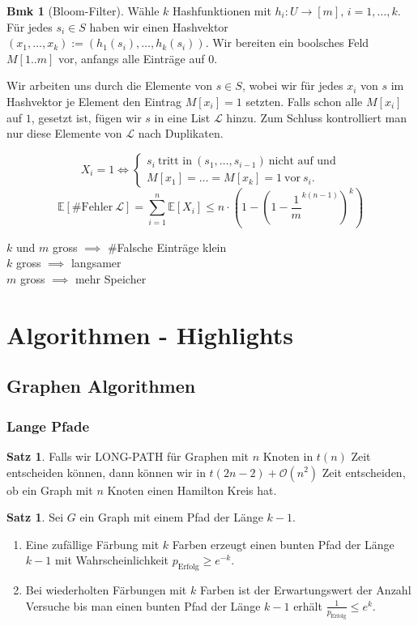 \documentclass[a4paper, 10pt]{article}
\theoremstyle{definition}
\newtheorem{theorem}[definition]{Satz}
\newtheorem*{note}{Bmk}
\theoremstyle{named}
\newcommand{\BO}{\mathcal{O}}
\newcommand{\E}{\mathbb{E}}
\begin{document}
\begin{note}[Bloom-Filter]
    Wähle $k$ Hashfunktionen mit $h_i: U \to [m], \, i=1,\ldots,k$. Für jedes $s_i \in S$ haben wir einen Hashvektor $(x_1, \ldots, x_k) := (h_1(s_i), \ldots, h_k(s_i))$. Wir bereiten ein boolsches Feld $M[1..m]$ vor, anfangs alle Einträge auf $0$. 

    Wir arbeiten uns durch die Elemente von $s \in S$, wobei wir für jedes $x_i$ von $s$ im Hashvektor je Element den Eintrag $M[x_i] = 1$ setzten. Falls schon alle $M[x_i]$ auf $1$, gesetzt ist, fügen wir $s$ in eine List $\mathcal{L}$ hinzu. Zum Schluss kontrolliert man nur diese Elemente von $\mathcal{L}$ nach Duplikaten.

    $$X_i = 1 \iff \begin{cases}
        s_i \ \text{tritt in} \ (s_1, \ldots, s_{i-1}) \ \text{nicht auf und} \\
        M[x_1] = \ldots = M[x_k] = 1 \ \text{vor} \ s_i.
    \end{cases}$$
    $$\E[\text{\#Fehler} \ \mathcal{L}] = \sum_{i=1}^n \E[X_i] \leq n \cdot \left(1 - \left(1 - \frac{1}{m}^{k(n-1)} \right)^k \right)$$

    \begin{center}
        $k$ und $m$ gross $\implies$ \#Falsche Einträge klein \\
        $k$ gross $\implies$ langsamer \\
        $m$ gross $\implies$ mehr Speicher
    \end{center}
\end{note}

\section{Algorithmen - Highlights}
\subsection{Graphen Algorithmen}
\subsubsection{Lange Pfade}
\begin{theorem}
    Falls wir \textsc{LONG-PATH} für Graphen mit $n$ Knoten in $t(n)$ Zeit entscheiden können, dann können wir in $t(2n - 2) + \BO(n^2)$ Zeit entscheiden, ob ein Graph mit $n$ Knoten einen Hamilton Kreis hat.
\end{theorem}

\begin{theorem}
    Sei $G$ ein Graph mit einem Pfad der Länge $k-1$.
    \begin{enumerate}
        \item Eine zufällige Färbung mit $k$ Farben erzeugt einen bunten Pfad der Länge $k-1$ mit Wahrscheinlichkeit $p_{\text{Erfolg}} \geq e^{-k}$.
        \item Bei wiederholten Färbungen mit $k$ Farben ist der Erwartungswert der Anzahl Versuche bis man einen bunten Pfad der Länge $k-1$ erhält $\frac{1}{p_{\text{Erfolg}}} \leq e^k$.
    \end{enumerate}
\end{theorem}
\end{document}
